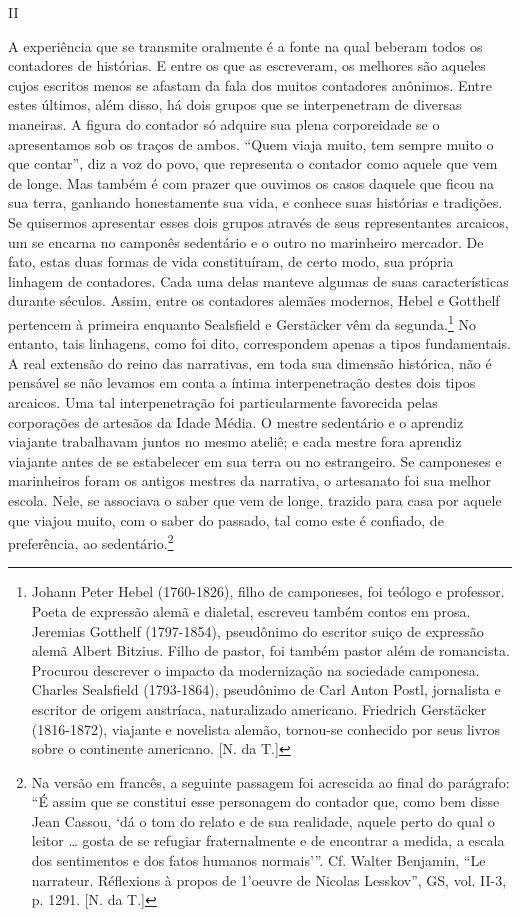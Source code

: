 II

A experiência que se transmite oralmente é a fonte na qual beberam todos
os contadores de histórias. E entre os que as escreveram, os melhores
são aqueles cujos escritos menos se afastam da fala dos muitos
contadores anônimos. Entre estes últimos, além disso, há dois grupos que
se interpenetram de diversas maneiras. A figura do contador só adquire
sua plena corporeidade se o apresentamos sob os traços de ambos. ``Quem
viaja muito, tem sempre muito o que contar'', diz a voz do povo, que
representa o contador como aquele que vem de longe. Mas também é com
prazer que ouvimos os casos daquele que ficou na sua terra, ganhando
honestamente sua vida, e conhece suas histórias e tradições. Se
quisermos apresentar esses dois grupos através de seus representantes
arcaicos, um se encarna no camponês sedentário e o outro no marinheiro
mercador. De fato, estas duas formas de vida constituíram, de certo
modo, sua própria linhagem de contadores. Cada uma delas manteve algumas
de suas características durante séculos. Assim, entre os contadores
alemães modernos, Hebel e Gotthelf pertencem à primeira enquanto
Sealsfield e Gerstäcker vêm da segunda.\footnote{Johann Peter Hebel
  (1760-1826), filho de camponeses, foi teólogo e professor. Poeta de
  expressão alemã e dialetal, escreveu também contos em prosa. Jeremias
  Gotthelf (1797-1854), pseudônimo do escritor suiço de expressão alemã
  Albert Bitzius. Filho de pastor, foi também pastor além de romancista.
  Procurou descrever o impacto da modernização na sociedade camponesa.
  Charles Sealsfield (1793-1864), pseudônimo de Carl Anton Postl,
  jornalista e escritor de origem austríaca, naturalizado americano.
  Friedrich Gerstäcker (1816-1872), viajante e novelista alemão,
  tornou-se conhecido por seus livros sobre o continente americano.
  {[}N. da T.{]}} No entanto, tais linhagens, como foi dito,
correspondem apenas a tipos fundamentais. A real extensão do reino das
narrativas, em toda sua dimensão histórica, não é pensável se não
levamos em conta a íntima interpenetração destes dois tipos arcaicos.
Uma tal interpenetração foi particularmente favorecida pelas corporações
de artesãos da Idade Média. O mestre sedentário e o aprendiz viajante
trabalhavam juntos no mesmo ateliê; e cada mestre fora aprendiz viajante
antes de se estabelecer em sua terra ou no estrangeiro. Se camponeses e
marinheiros foram os antigos mestres da narrativa, o artesanato foi sua
melhor escola. Nele, se associava o saber que vem de longe, trazido para
casa por aquele que viajou muito, com o saber do passado, tal como este
é confiado, de preferência, ao sedentário.\footnote{Na versão em
  francês, a seguinte passagem foi acrescida ao final do parágrafo: ``É
  assim que se constitui esse personagem do contador que, como bem disse
  Jean Cassou, `dá o tom do relato e de sua realidade, aquele perto do
  qual o leitor \ldots{} gosta de se refugiar fraternalmente e de
  encontrar a medida, a escala dos sentimentos e dos fatos humanos
  normais'''. Cf. Walter Benjamin, ``Le narrateur. Réflexions à propos
  de 1'oeuvre de Nicolas Lesskov'', GS, vol. II-3, p. 1291. {[}N. da
  T.{]}}

